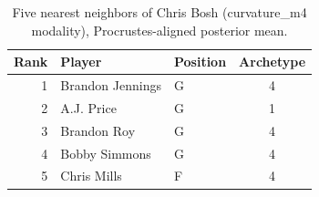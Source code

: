\begin{table}[htbp]
  \centering\small
  \begin{tabular}{rllc}
    \toprule
    Rank & Player & Position & Archetype \\
    \midrule
    1 & Brandon Jennings & G & 4 \\
    2 & A.J. Price & G & 1 \\
    3 & Brandon Roy & G & 4 \\
    4 & Bobby Simmons & G & 4 \\
    5 & Chris Mills & F & 4 \\
    \bottomrule
  \end{tabular}
  \caption{Five nearest neighbors of Chris Bosh (curvature_m4 modality), Procrustes-aligned posterior mean.}
  \label{tab:Chris_Bosh_neighbors_curvature_m4}
\end{table}

